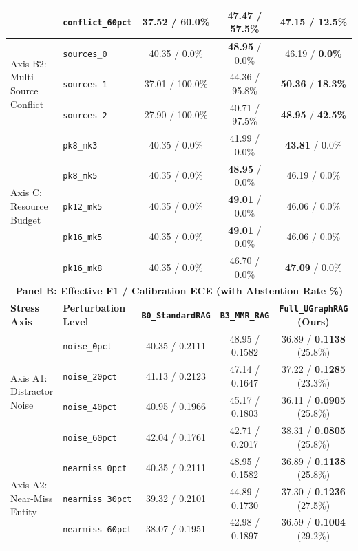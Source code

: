 \documentclass[11pt]{article}
\begin{document}
\begin{table}[t]
{{\begin{tabular}{llccc}
& \texttt{conflict\_60pct} & 37.52 / 60.0\% & \textbf{47.47} / 57.5\% & 47.15 / \textbf{12.5\%} \\
\midrule
\multirow{3}{*}{Axis B2: Multi-Source Conflict}
& \texttt{sources\_0} & 40.35 / 0.0\% & \textbf{48.95} / 0.0\% & 46.19 / \textbf{0.0\%} \\
& \texttt{sources\_1} & 37.01 / 100.0\% & 44.36 / 95.8\% & \textbf{50.36} / \textbf{18.3\%} \\
& \texttt{sources\_2} & 27.90 / 100.0\% & 40.71 / 97.5\% & \textbf{48.95} / \textbf{42.5\%} \\
\midrule
\multirow{5}{*}{Axis C: Resource Budget}
& \texttt{pk8\_mk3} & 40.35 / 0.0\% & 41.99 / 0.0\% & \textbf{43.81} / 0.0\% \\
& \texttt{pk8\_mk5} & 40.35 / 0.0\% & \textbf{48.95} / 0.0\% & 46.19 / 0.0\% \\
& \texttt{pk12\_mk5} & 40.35 / 0.0\% & \textbf{49.01} / 0.0\% & 46.06 / 0.0\% \\
& \texttt{pk16\_mk5} & 40.35 / 0.0\% & \textbf{49.01} / 0.0\% & 46.06 / 0.0\% \\
& \texttt{pk16\_mk8} & 40.35 / 0.0\% & 46.70 / 0.0\% & \textbf{47.09} / 0.0\% \\
\midrule
\midrule
\multicolumn{5}{c}{\textbf{Panel B: Effective F1 / Calibration ECE (with Abstention Rate \%)}} \\
\midrule
\textbf{Stress Axis} & \textbf{Perturbation Level} & \textbf{\texttt{B0\_StandardRAG}} & \textbf{\texttt{B3\_MMR\_RAG}} & \textbf{\texttt{Full\_UGraphRAG} (Ours)} \\
\midrule
\multirow{4}{*}{Axis A1: Distractor Noise}
& \texttt{noise\_0pct} & 40.35 / 0.2111 & 48.95 / 0.1582 & 36.89 / \textbf{0.1138} (25.8\%) \\
& \texttt{noise\_20pct} & 41.13 / 0.2123 & 47.14 / 0.1647 & 37.22 / \textbf{0.1285} (23.3\%) \\
& \texttt{noise\_40pct} & 40.95 / 0.1966 & 45.17 / 0.1803 & 36.11 / \textbf{0.0905} (25.8\%) \\
& \texttt{noise\_60pct} & 42.04 / 0.1761 & 42.71 / 0.2017 & 38.31 / \textbf{0.0805} (25.8\%) \\
\midrule
\multirow{3}{*}{Axis A2: Near-Miss Entity}
& \texttt{nearmiss\_0pct} & 40.35 / 0.2111 & 48.95 / 0.1582 & 36.89 / \textbf{0.1138} (25.8\%) \\
& \texttt{nearmiss\_30pct} & 39.32 / 0.2101 & 44.89 / 0.1730 & 37.30 / \textbf{0.1236} (27.5\%) \\
& \texttt{nearmiss\_60pct} & 38.07 / 0.1951 & 42.98 / 0.1897 & 36.59 / \textbf{0.1004} (29.2\%) \\

\end{tabular}}}
\end{table}
\end{document}
